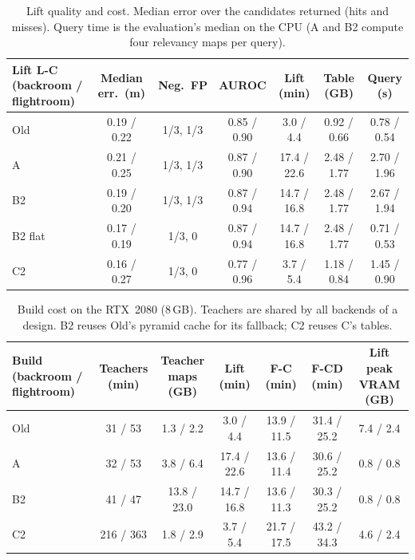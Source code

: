 \documentclass[11pt,a4paper]{article}
\begin{document}
\begin{table}[ht]
\centering\small
\begin{tabularx}{\linewidth}{@{}Lcccccc@{}}
\toprule
Lift L-C (backroom / flightroom) & Median err.\ (m) & Neg.\ FP & AUROC & Lift (min) & Table (GB) & Query (s) \\
\midrule
Old & 0.19 / 0.22 & 1/3, 1/3 & 0.85 / 0.90 & 3.0 / 4.4 & 0.92 / 0.66 & 0.78 / 0.54 \\
A   & 0.21 / 0.25 & 1/3, 1/3 & 0.87 / 0.90 & 17.4 / 22.6 & 2.48 / 1.77 & 2.70 / 1.96 \\
B2  & 0.19 / 0.20 & 1/3, 1/3 & 0.87 / 0.94 & 14.7 / 16.8 & 2.48 / 1.77 & 2.67 / 1.94 \\
B2 flat & 0.17 / 0.19 & 1/3, 0 & 0.87 / 0.94 & 14.7 / 16.8 & 2.48 / 1.77 & 0.71 / 0.53 \\
C2  & 0.16 / 0.27 & 1/3, 0 & 0.77 / 0.96 & 3.7 / 5.4 & 1.18 / 0.84 & 1.45 / 0.90 \\
\bottomrule
\end{tabularx}
\caption{Lift quality and cost. Median error over the candidates returned (hits and misses). Query time is the
evaluation's median on the CPU (A and B2 compute four relevancy maps per query).}
\label{tab:liftdetail}
\end{table}

\begin{table}[ht]
\centering\small
\begin{tabular}{@{}lcccccc@{}}
\toprule
\shortstack[l]{Build\\(backroom / flightroom)} & \shortstack{Teachers\\(min)} & \shortstack{Teacher\\maps (GB)} & \shortstack{Lift\\(min)} & \shortstack{F-C\\(min)} & \shortstack{F-CD\\(min)} & \shortstack{Lift peak\\VRAM (GB)} \\
\midrule
Old & 31 / 53   & 1.3 / 2.2   & 3.0 / 4.4   & 13.9 / 11.5 & 31.4 / 25.2 & 7.4 / 2.4 \\
A   & 32 / 53   & 3.8 / 6.4   & 17.4 / 22.6 & 13.6 / 11.4 & 30.6 / 25.2 & 0.8 / 0.8 \\
B2  & 41 / 47   & 13.8 / 23.0 & 14.7 / 16.8 & 13.6 / 11.3 & 30.3 / 25.2 & 0.8 / 0.8 \\
C2  & 216 / 363 & 1.8 / 2.9   & 3.7 / 5.4   & 21.7 / 17.5 & 43.2 / 34.3 & 4.6 / 2.4 \\
\bottomrule
\end{tabular}
\caption{Build cost on the RTX~2080 (8\,GB). Teachers are shared by all backends of a design. B2 reuses Old's pyramid
cache for its fallback; C2 reuses C's tables.}
\end{table}
\end{document}
